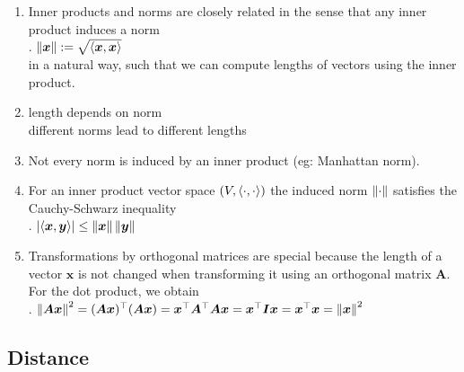 \begin{enumerate}
    \item Inner products and norms are closely related in the sense that any inner product induces a norm
    \hfill \cite{mfml/book/mml/Deisenroth-Faisal-Ong}
    \\
    .\hfill
    $\left\| \bm{x} \right\| := \sqrt{\langle\bm{x}, \bm{x}\rangle}$
    \hfill \cite{mfml/book/mml/Deisenroth-Faisal-Ong}
    \\
    in a natural way, such that we can compute lengths of vectors using the inner product.
    \hfill \cite{mfml/book/mml/Deisenroth-Faisal-Ong}

    \item length depends on norm
    \hfill \cite{common/online/chatgpt}
    \\
    different norms lead to different lengths
    \hfill \cite{common/online/chatgpt}

    \item Not every norm is induced by an inner product (eg: Manhattan norm).
    \hfill \cite{mfml/book/mml/Deisenroth-Faisal-Ong}

    \item
    \begin{definition}
    For an inner product vector space $(V,\langle\cdot, \cdot\rangle)$ the induced norm $\left\| \cdot \right\|$ satisfies the Cauchy-Schwarz inequality
    \hfill \cite{mfml/book/mml/Deisenroth-Faisal-Ong}
    \\
    .\hfill
    $\left| \langle\bm{x}, \bm{y}\rangle \right| \leq \left\| \bm{x} \right\| \left\| \bm{y} \right\|$
    \hfill \cite{mfml/book/mml/Deisenroth-Faisal-Ong}
    \end{definition}

    \item Transformations by orthogonal matrices are special because the length of a vector $\bm{x}$ is not changed when transforming it using an orthogonal matrix $\bm{A}$.
    For the dot product, we obtain
    \hfill \cite{mfml/book/mml/Deisenroth-Faisal-Ong}
    \\
    .\hfill
    $
        \left\| \bm{Ax} \right\|^2
        = (\bm{Ax})^\top (\bm{Ax})
        = \bm{x}^\top \bm{A}^\top \bm{Ax}
        = \bm{x}^\top \bm{Ix}
        = \bm{x}^\top \bm{x}
        = \left\| \bm{x} \right\|^2
    $
    \hfill \cite{mfml/book/mml/Deisenroth-Faisal-Ong}
\end{enumerate}





\subsection{Distance}

